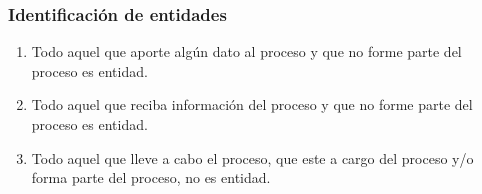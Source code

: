 \documentclass{templateNote}
\begin{document}
\subsubsection{Identificación de entidades}
\begin{enumerate}
    \item Todo aquel que aporte algún dato al proceso y que no forme parte del proceso es entidad.
    
    \item Todo aquel que reciba información del proceso y que no forme parte del proceso es entidad.
    
    \item Todo aquel que lleve a cabo el proceso, que este a cargo del proceso y/o forma parte del proceso, no es entidad.
\end{enumerate}
\end{document}

